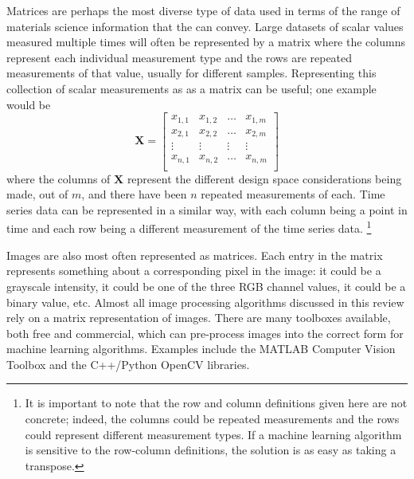 Matrices are perhaps the most diverse type of data used in terms of the range of materials science information that the can convey. Large datasets of scalar values measured multiple times will often be represented by a matrix where the columns represent each individual measurement type and the rows are repeated measurements of that value, usually for different samples. Representing this collection of scalar measurements as as a matrix can be useful; one example would be
\begin{equation}
	\mathbf{X} = \begin{bmatrix} x_{1,1} & x_{1,2} & \hdots & x_{1,m} \\
						x_{2,1} & x_{2,2} & \hdots & x_{2,m} \\
						\vdots & \vdots & \vdots & \vdots \\
						x_{n,1} & x_{n,2} & \hdots & x_{n,m} \\
				\end{bmatrix}
	\label{matrix}
\end{equation}
where the columns of $\mathbf{X}$ represent the different design space considerations being made, out of $m$, and there have been $n$ repeated measurements of each. Time series data can be represented in a similar way, with each column being a point in time and each row being a different measurement of the time series data. \footnote{It is important to note that the row and column definitions given here are not concrete; indeed, the columns could be repeated measurements and the rows could represent different measurement types. If a machine learning algorithm is sensitive to the row-column definitions, the solution is as easy as taking a transpose.}

Images are also most often represented as matrices. Each entry in the matrix represents something about a corresponding pixel in the image: it could be a grayscale intensity, it could be one of the three RGB channel values, it could be a binary value, etc. Almost all image processing algorithms discussed in this review rely on a matrix representation of images. There are many toolboxes available, both free and commercial, which can pre-process images into the correct form for machine learning algorithms. Examples include the MATLAB Computer Vision Toolbox and the C++/Python OpenCV libraries.

